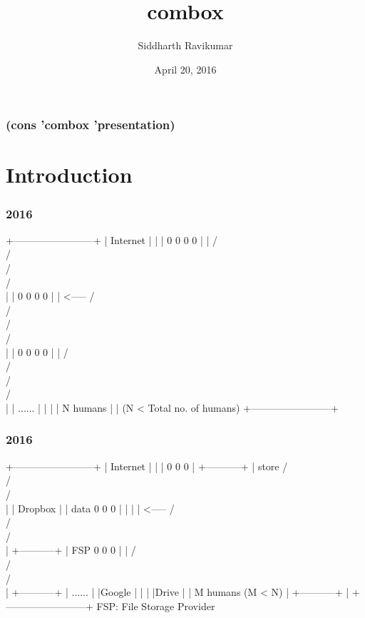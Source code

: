 \documentclass[17pt]{beamer}
\title{combox}
\author{Siddharth Ravikumar}
\institute{0x00B252AF}
\date{April 20, 2016}
\begin{document}
\begin{frame}
  \titlepage
\end{frame}

\begin{frame}
  \frametitle{(cons 'combox 'presentation)}
  \tableofcontents
\end{frame}

\section{Introduction}

\begin{frame}[fragile]
  \frametitle{2016}
  {\scriptsize
  \begin{semiverbatim}
   +------------------------+
   | Internet               |
   |                        |          0   0   0   0
   |                        |         / \\ / \\ / \\ / \\
   |                        |          0   0   0   0
   |                        | <-----  / \\ / \\ / \\ / \\
   |                        |          0   0   0   0
   |                        |         / \\ / \\ / \\ / \\
   |                        |              ......
   |                        |
   |                        |             N humans
   |                        |       (N < Total no. of humans)
   +------------------------+
  \end{semiverbatim}
  }
\end{frame}


\begin{frame}[fragile]
  \frametitle{2016}
  {\scriptsize
  \begin{semiverbatim}
   +------------------------+
   | Internet               |
   |                        |          0   0   0
   |  +-----------+         | store   / \\ / \\ / \\
   |  | Dropbox   |         |  data    0   0   0
   |  |           |         | <-----  / \\ / \\ / \\
   |  +-----------+         |   FSP    0   0   0
   |                        |         / \\ / \\ / \\
   |          +-----------+ |           ......
   |          |Google     | |
   |          |Drive      | |             M humans (M < N)
   |          +-----------+ |
   +------------------------+      FSP: File Storage Provider
  \end{semiverbatim}
  }
\end{frame}
\end{document}
